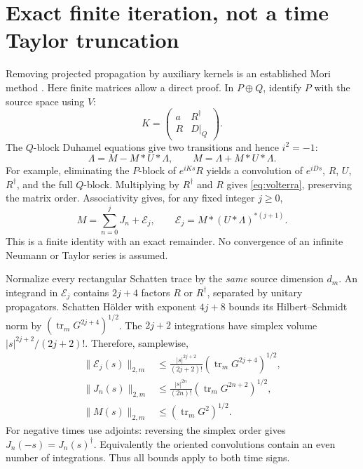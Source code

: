 \documentclass[11pt,a4paper]{article}
\newcommand{\tr}{\operatorname{tr}}
\begin{document}
\newpage
\section{Exact finite iteration, not a time Taylor truncation}
Removing projected propagation by auxiliary kernels is an established
Mori method \cite{MR,WZS}. Here finite matrices allow a direct proof.
In $P\oplus Q$, identify $P$ with the source space using $V$:
\begin{equation}
 K=\begin{pmatrix}a&R^\dagger\\R&D|_Q\end{pmatrix}.
\end{equation}
The $Q$-block Duhamel equations give two transitions and hence $i^2=-1$:
\begin{equation}
 \Lambda=M-M*U*\Lambda,\qquad M=\Lambda+M*U*\Lambda.\label{eq:volterra}
\end{equation}
For example, eliminating the $P$-block of $e^{iKs}R$ yields a
convolution of $e^{iDs}$, $R$, $U$, $R^\dagger$, and the full
$Q$-block. Multiplying by $R^\dagger$ and $R$ gives
\eqref{eq:volterra}, preserving the matrix order.
Associativity gives, for any fixed integer $j\geq0$,
\begin{equation}
 M=\sum_{n=0}^jJ_n+\mathcal E_j,\qquad
 \mathcal E_j=M*(U*\Lambda)^{*(j+1)}.\label{eq:finite}
\end{equation}
This is a finite identity with an exact remainder. No convergence
of an infinite Neumann or Taylor series is assumed.

Normalize every rectangular Schatten trace by the \emph{same}
source dimension $d_m$. An integrand in $\mathcal E_j$ contains
$2j+4$ factors $R$ or $R^\dagger$, separated by unitary
propagators. Schatten H\"older with exponent $4j+8$ bounds its
Hilbert--Schmidt norm by $(\tr_mG^{2j+4})^{1/2}$.
The $2j+2$ integrations have simplex volume
$|s|^{2j+2}/(2j+2)!$. Therefore, samplewise,
\begin{align}
 \|\mathcal E_j(s)\|_{2,m}
 &\leq\frac{|s|^{2j+2}}{(2j+2)!}(\tr_mG^{2j+4})^{1/2},\label{eq:rem}\\
 \|J_n(s)\|_{2,m}
 &\leq\frac{|s|^{2n}}{(2n)!}(\tr_mG^{2n+2})^{1/2},\label{eq:term}\\
 \|M(s)\|_{2,m}&\leq(\tr_mG^2)^{1/2}.
\end{align}
For negative times use adjoints: reversing the simplex order gives
$J_n(-s)=J_n(s)^\dagger$. Equivalently the oriented convolutions
contain an even number of integrations. Thus all bounds apply to
both time signs.
\end{document}
